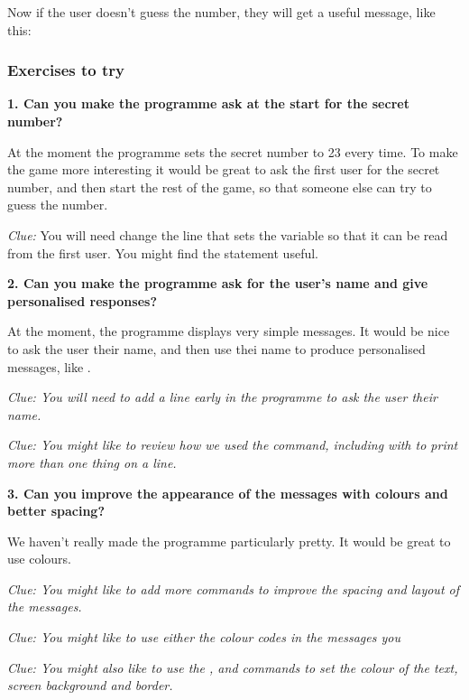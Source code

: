 \needspace{4cm}
Now if the user doesn't guess the number, they will get a useful
message, like this:


\subsubsection{Exercises to try}
  
{\bf 1. Can you make the programme ask at the start for the secret number?}

At the moment the programme sets the secret number to 23 every
time. To make the game more interesting it would be great to ask the
first user for the secret number, and then start the rest of the game,
so that someone else can try to guess the number.

{\em Clue:} You will need change the line that sets the  variable 
so that it can be read from the first user. You might find the
 statement useful.

{\bf 2. Can you make the programme ask for the user's name and give
  personalised responses?}

At the moment, the programme displays very simple messages. It would
be nice to ask the user their name, and then use thei name to produce
personalised messages, like .

{\em Clue: You will need to add a line early in the programme to ask
  the user their name.}

{\em Clue: You might like to review how we used the 
  command, including with \stw{;} to print more than one thing on a line.} 

{\bf 3. Can you improve the appearance of the messages with colours and better spacing?}

We haven't really made the programme particularly pretty.  It would be
great to use colours.

{\em Clue: You might like to add more  commands to improve
  the spacing and layout of the messages.}

{\em Clue: You might like to use either the colour codes
  in the messages you }

{\em Clue: You might also like to use the ,
 and  commands to set the colour of the
text, screen background and border.
}


